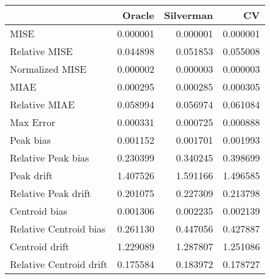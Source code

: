 \begin{tabular}{lrrr}
  \hline
 & Oracle & Silverman & CV \\ 
  \hline
MISE & 0.000001 & 0.000001 & 0.000001 \\ 
  Relative MISE & 0.044898 & 0.051853 & 0.055008 \\ 
  Normalized MISE & 0.000002 & 0.000003 & 0.000003 \\ 
  MIAE & 0.000295 & 0.000285 & 0.000305 \\ 
  Relative MIAE & 0.058994 & 0.056974 & 0.061084 \\ 
  Max Error & 0.000331 & 0.000725 & 0.000888 \\ 
  Peak bias & 0.001152 & 0.001701 & 0.001993 \\ 
  Relative Peak bias & 0.230399 & 0.340245 & 0.398699 \\ 
  Peak drift & 1.407526 & 1.591166 & 1.496585 \\ 
  Relative Peak drift & 0.201075 & 0.227309 & 0.213798 \\ 
  Centroid bias & 0.001306 & 0.002235 & 0.002139 \\ 
  Relative Centroid bias & 0.261130 & 0.447056 & 0.427887 \\ 
  Centroid drift & 1.229089 & 1.287807 & 1.251086 \\ 
  Relative Centroid drift & 0.175584 & 0.183972 & 0.178727 \\ 
   \hline
\end{tabular}
